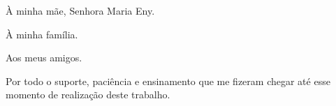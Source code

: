 
\vfill
À minha mãe, Senhora Maria Eny.

À minha família.

Aos meus amigos.

Por todo o suporte, paciência e ensinamento que me fizeram chegar até esse momento de realização deste trabalho.
